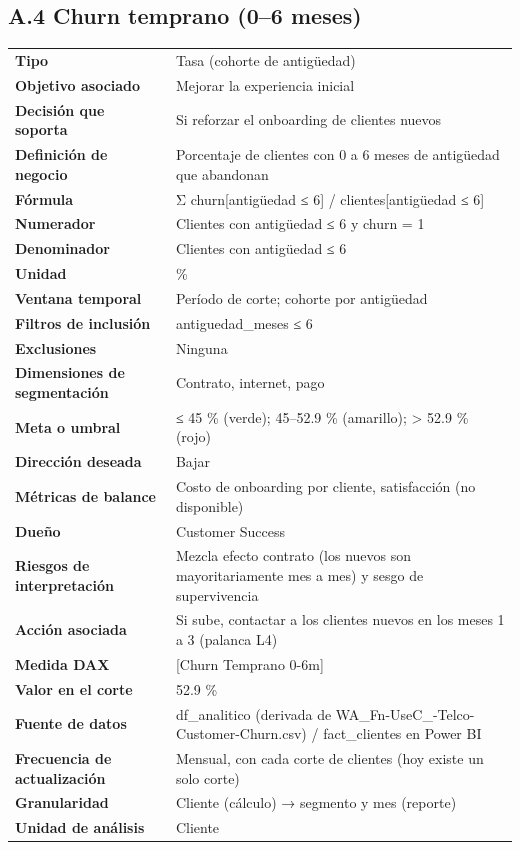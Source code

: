 \subsection*{A.4 Churn temprano (0–6 meses)}
\begin{footnotesize}
\begin{longtable}{@{}p{}p{}@{}}
\toprule
\textbf{Tipo} & Tasa (cohorte de antigüedad) \\
\textbf{Objetivo asociado} & Mejorar la experiencia inicial \\
\textbf{Decisión que soporta} & Si reforzar el onboarding de clientes nuevos \\
\textbf{Definición de negocio} & Porcentaje de clientes con 0 a 6 meses de antigüedad que abandonan \\
\textbf{Fórmula} & Σ churn[antigüedad ≤ 6] / clientes[antigüedad ≤ 6] \\
\textbf{Numerador} & Clientes con antigüedad ≤ 6 y churn = 1 \\
\textbf{Denominador} & Clientes con antigüedad ≤ 6 \\
\textbf{Unidad} & \% \\
\textbf{Ventana temporal} & Período de corte; cohorte por antigüedad \\
\textbf{Filtros de inclusión} & antiguedad\_meses ≤ 6 \\
\textbf{Exclusiones} & Ninguna \\
\textbf{Dimensiones de segmentación} & Contrato, internet, pago \\
\textbf{Meta o umbral} & ≤ 45 \% (verde); 45–52.9 \% (amarillo); > 52.9 \% (rojo) \\
\textbf{Dirección deseada} & Bajar \\
\textbf{Métricas de balance} & Costo de onboarding por cliente, satisfacción (no disponible) \\
\textbf{Dueño} & Customer Success \\
\textbf{Riesgos de interpretación} & Mezcla efecto contrato (los nuevos son mayoritariamente mes a mes) y sesgo de supervivencia \\
\textbf{Acción asociada} & Si sube, contactar a los clientes nuevos en los meses 1 a 3 (palanca L4) \\
\textbf{Medida DAX} & [Churn Temprano 0-6m] \\
\textbf{Valor en el corte} & 52.9 \% \\
\textbf{Fuente de datos} & df\_analitico (derivada de WA\_Fn-UseC\_-Telco-Customer-Churn.csv) / fact\_clientes en Power BI \\
\textbf{Frecuencia de actualización} & Mensual, con cada corte de clientes (hoy existe un solo corte) \\
\textbf{Granularidad} & Cliente (cálculo) → segmento y mes (reporte) \\
\textbf{Unidad de análisis} & Cliente \\
\bottomrule
\end{longtable}
\end{footnotesize}

